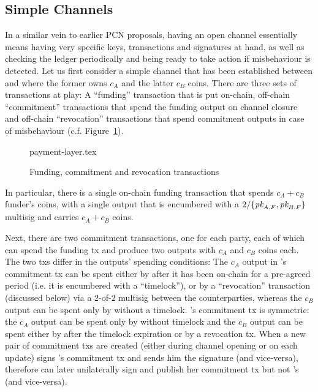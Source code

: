 \subsection{Simple Channels}
  In a similar vein to earlier PCN proposals, having an open channel essentially
  means having very specific keys, transactions and signatures at hand, as well
  as checking the ledger periodically and being ready to take action if
  misbehaviour is detected. Let us first consider a simple channel that has been
  established between \alice and \bob where the former owns $c_A$ and the latter
  $c_B$ coins. There are three sets of transactions at play: A ``funding''
  transaction that is put on-chain, off-chain ``commitment'' transactions that
  spend the funding output on channel closure and off-chain ``revocation''
  transactions that spend commitment outputs in case of misbehaviour (c.f.
  Figure~\ref{figure:payment-layer}).

  \begin{figure}
    {payment-layer.tex}
    \caption{Funding, commitment and revocation transactions}
    \label{figure:payment-layer}
  \end{figure}

  In particular, there is a single on-chain funding transaction that spends $c_A
  + c_B$ funder's coins, with a single output that is encumbered with a
  $2/\{\textit{pk}_{A, F}, \textit{pk}_{B, F}\}$ multisig and carries $c_A + c_B$ coins.

  Next, there are two commitment transactions, one for each party, each of which can spend the
  funding tx and produce two outputs with $c_A$ and $c_B$ coins each. The two
  txs differ in the outputs' spending conditions: The $c_A$ output in \alice's
  commitment tx can be spent either by \alice after it has been on-chain for a
  pre-agreed period (i.e. it is encumbered with a ``timelock''), or by a
  ``revocation'' transaction (discussed below) via a $2$-of-$2$ multisig between
  the counterparties, whereas the $c_B$ output can be spent only by \bob without
  a timelock. \bob's commitment tx is symmetric: the $c_A$ output can be spent
  only by \alice without timelock and the $c_B$ output can be spent either by
  \bob after the timelock expiration or by a revocation tx. When a new pair of
  commitment txs are created (either during channel opening or on each update)
  \alice signs \bob's commitment tx and sends him the signature (and
  vice-versa), therefore \alice can later unilaterally sign and publish her commitment
  tx but not \bob's (and vice-versa).


